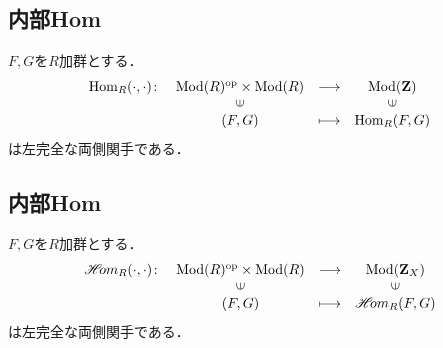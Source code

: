 






























\subsection{内部Hom}
\begin{PRP}[Homは左完全]
    $F,G$を$R$加群とする．
    \begin{equation*}
        \begin{array}{rccc}
            \Hom_R({\cdot},{\cdot})\colon
            &\Mod(R)^{\op}\times\Mod(R)
            &\longrightarrow&\Mod(\zz)\\
            &\rotatebox{90}{$\in$}&&\rotatebox{90}{$\in$}\\
            & (F,G)&\longmapsto&\Hom_R(F,G)
        \end{array}
    \end{equation*}
    は左完全な両側関手である．
\end{PRP}


\subsection{内部Hom}
\begin{PRP}[Homは左完全]
    $F,G$を$R$加群とする．
    \begin{equation*}
        \begin{array}{rccc}
            \HOM_R({\cdot},{\cdot})\colon
            &\Mod(R)^{\op}\times\Mod(R)
            &\longrightarrow&\Mod(\zz_X)\\
            &\rotatebox{90}{$\in$}&&\rotatebox{90}{$\in$}\\
            & (F,G)&\longmapsto&\HOM_R(F,G)
        \end{array}
    \end{equation*}
    は左完全な両側関手である．
\end{PRP}

